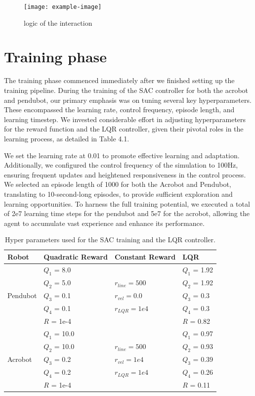 \begin{figure}[H]
    \centering
    \texttt{[image: example-image]}
    \caption{logic of the interaction}
    \label{fig:my_label}
\end{figure}

\section{Training phase}
The training phase commenced immediately after we finished setting up the training pipeline. During the training of the SAC controller for both the acrobot and pendubot, our primary emphasis was on tuning several key hyperparameters. These encompassed the learning rate, control frequency, episode length, and learning timestep. We invested considerable effort in adjusting hyperparameters for the reward function and the LQR controller, given their pivotal roles in the learning process, as detailed in Table 4.1.

We set the learning rate at 0.01 to promote effective learning and adaptation. Additionally, we configured the control frequency of the simulation to 100Hz, ensuring frequent updates and heightened responsiveness in the control process. We selected an episode length of 1000 for both the Acrobot and Pendubot, translating to 10-second-long episodes, to provide sufficient exploration and learning opportunities. To harness the full training potential, we executed a total of 2e7 learning time steps for the pendubot and 5e7 for the acrobot, allowing the agent to accumulate vast experience and enhance its performance.


\begin{table}[H]
  \centering
  \begin{tabular}{p{2cm} | p{3cm} | p{3cm} | p{3cm}}
  Robot & Quadratic Reward  & Constant Reward & LQR\\
  \hline
  \multirow{5}{*}{Pendubot} & \(Q_1\) = 8.0  &  & \(Q_1\) = 1.92\\
  & \(Q_2\) = 5.0  & \(r_{line}=500\) & \(Q_2\) = 1.92\\
  & \(Q_3\) = 0.1  & \(r_{vel}=0.0\) & \(Q_3\) = 0.3\\
  & \(Q_4\) = 0.1  & \(r_{LQR}=1e4\)& \(Q_4\) = 0.3\\
  & \(R\) = 1e-4  & & \(R\) = 0.82\\
  \hline
  \multirow{5}{*}{Acrobot} & \(Q_1\) = 10.0  &  & \(Q_1\) = 0.97\\
  & \(Q_2\) = 10.0  & \(r_{line}=500\) & \(Q_2\) = 0.93\\
  & \(Q_3\) = 0.2  & \(r_{vel}=1e4\) & \(Q_3\) = 0.39\\
  & \(Q_4\) = 0.2  & \(r_{LQR}=1e4\) & \(Q_4\) = 0.26\\
  & \(R\) = 1e-4  &  & \(R\) = 0.11\\
  \end{tabular}
 \caption{Hyper parameters used for the SAC training and the LQR controller.}
 \label{tab:parameters}
\end{table}


